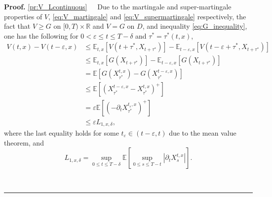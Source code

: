 \documentclass{tufte-handout}
\newcommand{\E}{\mathbb{E}} %
\newcommand{\R}{\mathbb{R}} %
\newenvironment{pf}[1][Proof]{\textbf{#1.} }{\ \rule{0.5em}{0.5em}}
\begin{document}
	\begin{pf}
		\ref{pr:V_Lcontinuous}\ \ \ Due to the martingale and super-martingale properties of $V$, \eqref{eq:V_martingale} and \eqref{eq:V_supermartingale} respectively, the fact that $V \geq G$ on $[0, T)\times\R$ and $V = G$ on $D$, and inequality \eqref{eq:G_inequality}, one has the following for $0 < \varepsilon \leq t \leq T - \delta$ and $\tau^* = \tau^*(t, x)$, 
		\begin{align}
		V(t, x) - V(t - \varepsilon, x) &\leq \E_{t, x}\left[V(t + \tau^*, X_{t + \tau^*})\right] - \E_{t - \varepsilon, x}\left[V(t - \varepsilon + \tau^*, X_{t + \tau^*})\right] \nonumber \\
		&\leq \E_{t, x}\left[G(X_{t + \tau^*})\right] - \E_{t - \varepsilon, x}\left[G(X_{t + \tau^*})\right] \nonumber \\
		&= \E\left[G\left(X_{\tau^*}^{t, x}\right) - G\left(X_{\tau^*}^{t - \varepsilon, x}\right)\right] \nonumber \\
		&\leq \E\left[\left(X_{\tau^*}^{t - \varepsilon, x} - X_{\tau^*}^{t, x}\right)^+\right] \nonumber \\
		&= \varepsilon\E\left[\left(-\partial_tX_{\tau^*}^{t_\varepsilon, x}\right)^+\right] \label{eq:Vt-Vt-eps<} \\
		&\leq \varepsilon L_{1, x, \delta}, \nonumber
		\end{align}
		where the last equality holds for some $t_\varepsilon\in(t - \varepsilon, t)$ due to the mean value theorem, and
		$$
		L_{1, x, \delta} = \sup_{0\leq t \leq T - \delta}\E\left[\sup_{0\leq s \leq T - t}|\partial_tX_s^{t, x}|\right].
		$$
		

\end{pf}
\end{document}
